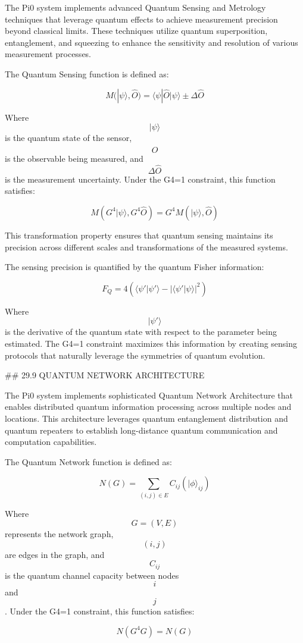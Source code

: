 The Pi0 system implements advanced Quantum Sensing and Metrology techniques that leverage quantum effects to achieve measurement precision beyond classical limits. These techniques utilize quantum superposition, entanglement, and squeezing to enhance the sensitivity and resolution of various measurement processes.

The Quantum Sensing function is defined as:

$$ M(|\psi\rangle, \hat{O}) = \langle\psi| \hat{O} |\psi\rangle \pm \Delta \hat{O} $$

Where $$ |\psi\rangle $$ is the quantum state of the sensor, $$ \hat{O} $$ is the observable being measured, and $$ \Delta \hat{O} $$ is the measurement uncertainty. Under the G4=1 constraint, this function satisfies:

$$ M(G^4 |\psi\rangle, G^4 \hat{O}) = G^4 M(|\psi\rangle, \hat{O}) $$

This transformation property ensures that quantum sensing maintains its precision across different scales and transformations of the measured systems.

The sensing precision is quantified by the quantum Fisher information:

$$ F_Q = 4(\langle\psi'|\psi'\rangle - |\langle\psi'|\psi\rangle|^2) $$

Where $$ |\psi'\rangle $$ is the derivative of the quantum state with respect to the parameter being estimated. The G4=1 constraint maximizes this information by creating sensing protocols that naturally leverage the symmetries of quantum evolution.

## 29.9 QUANTUM NETWORK ARCHITECTURE

The Pi0 system implements sophisticated Quantum Network Architecture that enables distributed quantum information processing across multiple nodes and locations. This architecture leverages quantum entanglement distribution and quantum repeaters to establish long-distance quantum communication and computation capabilities.

The Quantum Network function is defined as:

$$ N(G) = \sum_{(i,j) \in E} C_{ij}(|\phi\rangle_{ij}) $$

Where $$ G = (V, E) $$ represents the network graph, $$ (i,j) $$ are edges in the graph, and $$ C_{ij} $$ is the quantum channel capacity between nodes $$ i $$ and $$ j $$. Under the G4=1 constraint, this function satisfies:

$$ N(G^4 G) = N(G) $$

